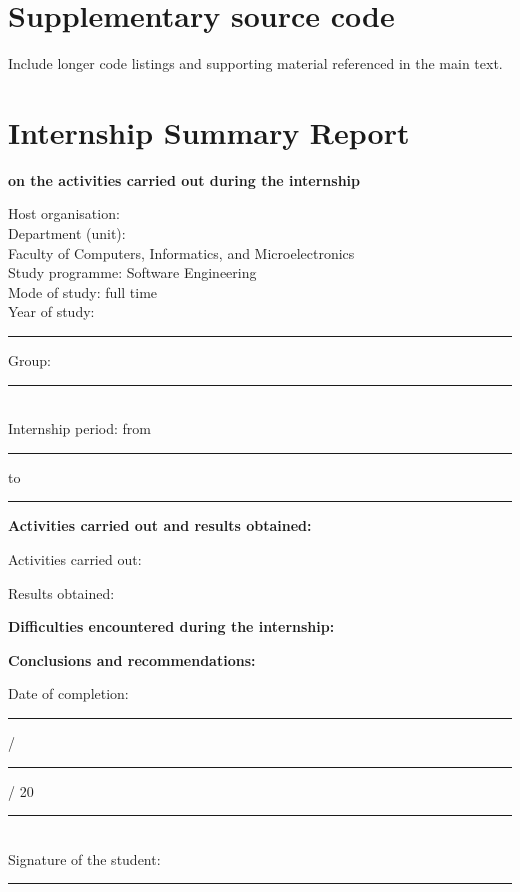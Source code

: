 \documentclass{../shared/classes/utmreport}
\begin{document}
\appendix
\chapter{Supplementary source code}
Include longer code listings and supporting material referenced in the main text.

\chapter*{Internship Summary Report}
\begin{center}
\textbf{on the activities carried out during the internship}
\end{center}
\noindent Host organisation: \hrulefill\\
Department (unit): \hrulefill\\
Faculty of Computers, Informatics, and Microelectronics\\
Study programme: Software Engineering\\
Mode of study: full time\\
Year of study: \rule{1cm}{0.3pt}\quad Group: \rule{2cm}{0.3pt}\\
Internship period: from \rule{2cm}{0.3pt}\quad to \rule{2cm}{0.3pt}

\noindent\textbf{Activities carried out and results obtained:}

\noindent Activities carried out: \hrulefill\par\vspace{0.3cm}
\noindent Results obtained: \hrulefill\par\vspace{0.3cm}
\noindent\textbf{Difficulties encountered during the internship:}\par
\noindent\hrulefill\par\vspace{0.3cm}
\noindent\textbf{Conclusions and recommendations:}\par
\noindent\hrulefill\par\vspace{0.3cm}
\noindent\hrulefill\par\vspace{0.3cm}
\noindent Date of completion: \rule{0.6cm}{0.3pt} / \rule{0.6cm}{0.3pt} / 20\rule{0.6cm}{0.3pt}\\
Signature of the student: \rule{4cm}{0.3pt}
\end{document}
